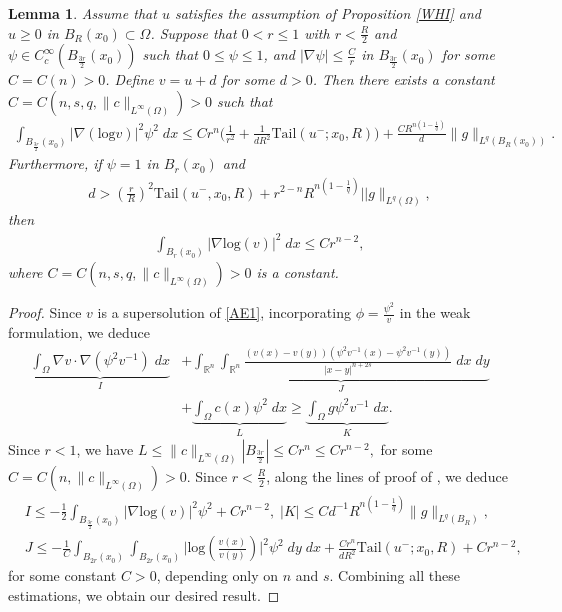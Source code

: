 \documentclass[11pt, notitlepage]{article}
\def\R{\mathbb{R}}
\newtheorem{Lemma}[Theorem]{Lemma}
\begin{document}
{\begin{Lemma}\label{log}
Assume that $u$ satisfies the assumption of Proposition \ref{WHI} and $u\geq 0$ in $B_R(x_0)\subset\Omega$. Suppose that $0<r\leq 1$ with $r<\frac{R}{2}$ and $\psi\in C^\infty_c(B_\frac{3r}{2}(x_0))$ such that $0\leq \psi\leq 1$, and $|\nabla\psi|\leq \frac{C}{r}$ in $B_\frac{3r}{2}(x_0)$ for some $C=C(n)>0$. Define $v=u+d$ for some $d>0$. Then there exists a constant $C=C(n,s,q,\|c\|_{L^\infty(\Omega)})>0$ such that 
\begin{align}\label{AE2}
    \int_{B_\frac{3r}{2}(x_0)}|\nabla (\mathrm{log}v)|^2\psi^2\;dx\leq Cr^n\Big(\frac{1}{r^2}+\frac{1}{dR^2}\mathrm{Tail}(u^-;x_0,R)\Big)+\frac{CR^{n(1-\frac{1}{q})}}{d}\|g\|_{L^q(B_R(x_0))}.
\end{align}  
Furthermore, if $\psi=1$ in $B_r(x_0)$ and 
\begin{align}\label{lbb}
    d>\left(\frac{r}{R}\right)^2 \mathrm{Tail}(u^-,x_0,R)+r^{2-n}R^{n(1-\frac{1}{q})}||g\|_{L^q(\Omega)},
\end{align}
then 
\begin{align}
    \int_{B_{r}(x_0)}|\nabla \mathrm{log}(v)|^2\;dx\leq Cr^{n-2},
\end{align}
where $C=C(n,s,q,\|c\|_{L^\infty(\Omega)})>0$ is a constant.
\end{Lemma}
\begin{proof}
Since $v$ is a supersolution of \eqref{AE1}, incorporating $\phi=\frac{\psi^2}{v}$ in the weak formulation, we deduce
\begin{align}
 \underbrace{\int_\Omega\nabla v\cdot\nabla (\psi^2v^{-1})  \;dx}_{I}&+\underbrace{\int_{\R^n}\int_{\R^n}\frac{(v(x)-v(y))(\psi^2v^{-1}(x)-\psi^2v^{-1}(y))}{|x-y|^{n+2s}}\;dx\;dy}_{J}\nonumber\\
 &+\underbrace{\int_\Omega c(x)\psi^2\;dx}_{L}\geq \underbrace{\int_{\Omega}g\psi^2v^{-1}\;dx}_{K}. 
\end{align}
Since $r<1$, we have $L\leq \|c\|_{L^\infty(\Omega)}|B_{\frac{3r}{2}}|\leq Cr^n\leq Cr^{n-2},$ for some $C=C(n,\|c\|_{L^\infty(\Omega)})>0$. Since $r<\frac{R}{2}$, along the lines of proof of \cite[inequality (3.13)-(3.15), page 13]{Garain25}, we deduce
\begin{align*}
  &I\leq -\frac{1}{2}\int_{B_{\frac{3r}{2}}(x_0)} |\nabla \mathrm{log}(v)|^2\psi^2+Cr^{n-2},\;|K|\leq Cd^{-1}R^{n(1-\frac{1}{q})}\|g\|_{L^q(B_R)},\\
  &J\leq -\frac{1}{C}\int_{B_{2r}(x_0)}\int_{B_{2r}(x_0)}\Big|\mathrm{log}(\frac{v(x)}{v(y)})\Big|^2\psi^2\;dy\;dx+\frac{Cr^n}{dR^2}\mathrm{Tail}(u^-;x_0,R)+Cr^{n-2},
\end{align*}
for some constant $C>0$, depending only on $n$ and $s$. Combining all these estimations, we obtain our desired result.


\end{proof}}
\end{document}
